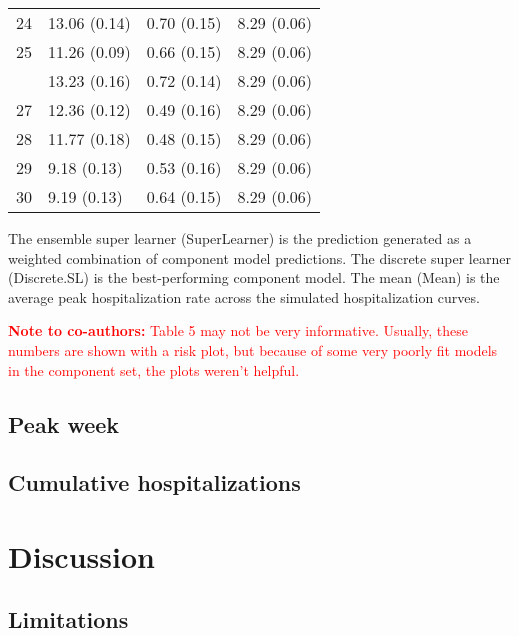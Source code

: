 \documentclass[10pt,letterpaper]{article}
\begin{document}
\begin{table}
\begin{threeparttable}
\begin{tabular}[t]{rlll}
24 & 13.06 (0.14) & 0.70 (0.15) & 8.29 (0.06)\\
25 & 11.26 (0.09) & 0.66 (0.15) & 8.29 (0.06)\\
\addlinespace
26 & 13.23 (0.16) & 0.72 (0.14) & 8.29 (0.06)\\
27 & 12.36 (0.12) & 0.49 (0.16) & 8.29 (0.06)\\
28 & 11.77 (0.18) & 0.48 (0.15) & 8.29 (0.06)\\
29 & 9.18 (0.13) & 0.53 (0.16) & 8.29 (0.06)\\
30 & 9.19 (0.13) & 0.64 (0.15) & 8.29 (0.06)\\
\bottomrule
\end{tabular}
\begin{tablenotes}
\item The ensemble super learner (SuperLearner) is the prediction generated as a weighted combination of component model predictions. The discrete super learner (Discrete.SL) is the best-performing component model. The mean (Mean) is the average peak hospitalization rate across the simulated hospitalization curves.
\end{tablenotes}
\end{threeparttable}
\end{table}

\textcolor{red}{\textbf{Note to co-authors:} Table 5 may not be very informative. Usually, these numbers are shown with a risk plot, but because of some very poorly fit models in the component set, the plots weren't helpful.}

\hypertarget{peak-week}{%
\subsection{Peak week}\label{peak-week}}

\hypertarget{cumulative-hospitalizations}{%
\subsection{Cumulative
hospitalizations}\label{cumulative-hospitalizations}}

\hypertarget{discussion}{%
\section{Discussion}\label{discussion}}

\hypertarget{limitations}{%
\subsection{Limitations}\label{limitations}}
\end{document}
